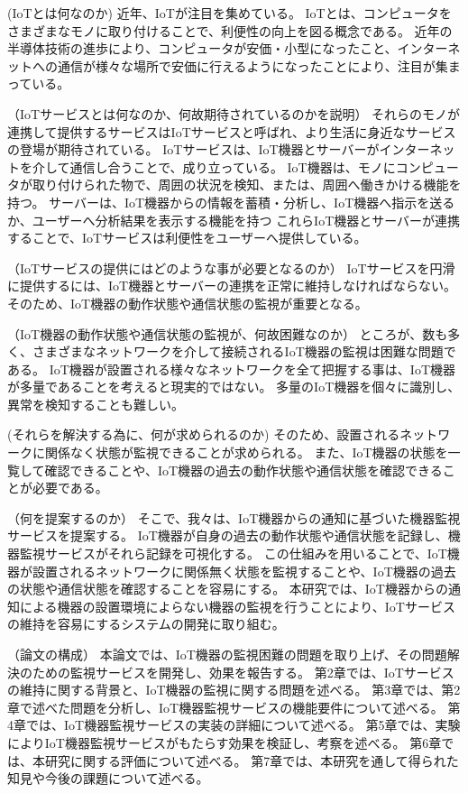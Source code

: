 
(IoTとは何なのか)
近年、IoTが注目を集めている。
IoTとは、コンピュータをさまざまなモノに取り付けることで、利便性の向上を図る概念である。
近年の半導体技術の進歩により、コンピュータが安価・小型になったこと、インターネットへの通信が様々な場所で安価に行えるようになったことにより、注目が集まっている。


（IoTサービスとは何なのか、何故期待されているのかを説明）
それらのモノが連携して提供するサービスはIoTサービスと呼ばれ、より生活に身近なサービスの登場が期待されている。
IoTサービスは、IoT機器とサーバーがインターネットを介して通信し合うことで、成り立っている。
IoT機器は、モノにコンピュータが取り付けられた物で、周囲の状況を検知、または、周囲へ働きかける機能を持つ。
サーバーは、IoT機器からの情報を蓄積・分析し、IoT機器へ指示を送るか、ユーザーへ分析結果を表示する機能を持つ
これらIoT機器とサーバーが連携することで、IoTサービスは利便性をユーザーへ提供している。


（IoTサービスの提供にはどのような事が必要となるのか）
IoTサービスを円滑に提供するには、IoT機器とサーバーの連携を正常に維持しなければならない。
そのため、IoT機器の動作状態や通信状態の監視が重要となる。


（IoT機器の動作状態や通信状態の監視が、何故困難なのか）
ところが、数も多く、さまざまなネットワークを介して接続されるIoT機器の監視は困難な問題である。
IoT機器が設置される様々なネットワークを全て把握する事は、IoT機器が多量であることを考えると現実的ではない。
多量のIoT機器を個々に識別し、異常を検知することも難しい。


(それらを解決する為に、何が求められるのか)
そのため、設置されるネットワークに関係なく状態が監視できることが求められる。
また、IoT機器の状態を一覧して確認できることや、IoT機器の過去の動作状態や通信状態を確認できることが必要である。

（何を提案するのか）
そこで、我々は、IoT機器からの通知に基づいた機器監視サービスを提案する。
IoT機器が自身の過去の動作状態や通信状態を記録し、機器監視サービスがそれら記録を可視化する。
この仕組みを用いることで、IoT機器が設置されるネットワークに関係無く状態を監視することや、IoT機器の過去の状態や通信状態を確認することを容易にする。
本研究では、IoT機器からの通知による機器の設置環境によらない機器の監視を行うことにより、IoTサービスの維持を容易にするシステムの開発に取り組む。


（論文の構成）
本論文では、IoT機器の監視困難の問題を取り上げ、その問題解決のための監視サービスを開発し、効果を報告する。
第2章では、IoTサービスの維持に関する背景と、IoT機器の監視に関する問題を述べる。
第3章では、第2章で述べた問題を分析し、IoT機器監視サービスの機能要件について述べる。
第4章では、IoT機器監視サービスの実装の詳細について述べる。
第5章では、実験によりIoT機器監視サービスがもたらす効果を検証し、考察を述べる。
第6章では、本研究に関する評価について述べる。
第7章では、本研究を通して得られた知見や今後の課題について述べる。


